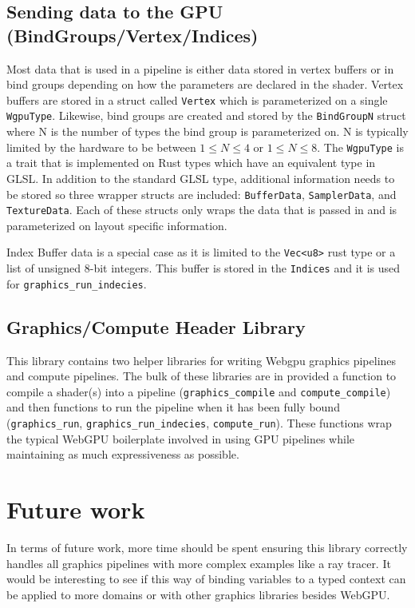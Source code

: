 \documentclass{article}
\begin{document}
\subsection{Sending data to the GPU (BindGroups/Vertex/Indices)}

Most data that is used in a pipeline is either data stored in vertex buffers or in bind groups depending on how the parameters are declared in the shader. Vertex buffers are stored in a struct called \lstinline{Vertex} which is parameterized on a single \lstinline{WgpuType}. Likewise, bind groups are created and stored by the \lstinline{BindGroupN} struct where N is the number of types the bind group is parameterized on. N is typically limited by the hardware to be between \(1 \leq N \leq 4\) or \(1 \leq N \leq 8\). The \lstinline{WgpuType} is a trait that is implemented on Rust types which have an equivalent type in GLSL. In addition to the standard GLSL type, additional information needs to be stored so three wrapper structs are included: \lstinline{BufferData}, \lstinline{SamplerData}, and \lstinline{TextureData}. Each of these structs only wraps the data that is passed in and is parameterized on layout specific information.

Index Buffer data is a special case as it is limited to the \lstinline{Vec<u8>} rust type or a list of unsigned 8-bit integers. This buffer is stored in the \lstinline{Indices} and it is used for \lstinline{graphics_run_indecies}.


\subsection{Graphics/Compute Header Library}
This library contains two helper libraries for writing Webgpu graphics pipelines and compute pipelines. The bulk of these libraries are in provided a function to compile a shader(s) into a pipeline (\lstinline{graphics_compile} and \lstinline{compute_compile}) and then functions to run the pipeline when it has been fully bound (\lstinline{graphics_run}, \lstinline{graphics_run_indecies}, \lstinline{compute_run}). These functions wrap the typical WebGPU boilerplate involved in using GPU pipelines while maintaining as much expressiveness as possible.
\section{Future work}
In terms of future work, more time should be spent ensuring this library correctly handles all graphics pipelines with more complex examples like a ray tracer. It would be interesting to see if this way of binding variables to a typed context can be applied to more domains or with other graphics libraries besides WebGPU.
\end{document}
